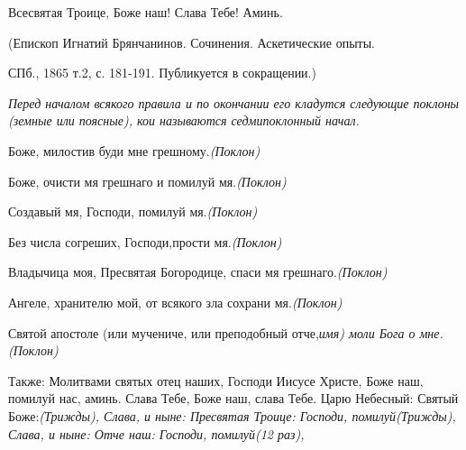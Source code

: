 Всесвятая Троице, Боже наш! Слава Тебе! Аминь.

(Епископ Игнатий Брянчанинов. Сочинения. Аскетические опыты.

СПб., 1865 т.2, с. 181-191. Публикуется в сокращении.)

 


\mychapterending

 





\itshape Перед началом всякого правила и по окончании его кладутся следующие поклоны (земные или поясные), кои называются седмипоклонный начал.




\normalfont{}




Боже, милостив буди мне грешному.\itshape  (Покло\normalfont{}н)

Боже, очисти мя грешнаго и помилуй мя.\itshape  (Поклон)


\normalfont{}




Создавый мя, Господи, помилуй мя.\itshape  (Поклон)


\normalfont{}




Без числа согреших, Господи,прости мя.\itshape  (Поклон)


\normalfont{}




Владычица моя, Пресвятая Богородице, спаси мя грешнаго.\itshape  (Поклон)


\normalfont{}




Ангеле, хранителю мой, от всякого зла сохрани мя.\itshape  (Поклон)


\normalfont{}




Святой апостоле (или мучениче, или преподобный отче,\itshape  им\normalfont{}я) моли Бога о мне\itshape . (Поклон)




\normalfont{}







\bfseries 


Также\normalfont{}: Молитвами святых отец наших, Господи Иисусе Христе, Боже наш, помилуй нас, аминь. Слава Тебе, Боже наш, слава Тебе. Царю Небесный: Святый Боже:\itshape  (Трижды\normalfont{}), Слава, и ныне: Пресвятая Троице: Господи, помилуй\itshape  (Трижды\normalfont{}), Слава, и ныне: Отче наш: Господи, помилуй\itshape  (12 раз\normalfont{}), 





